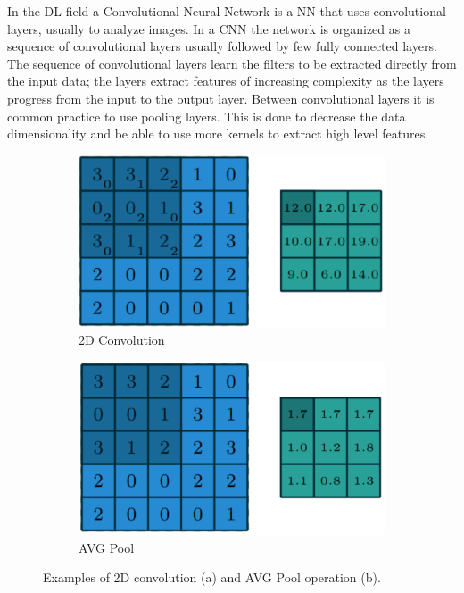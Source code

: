 \documentclass[../main.tex]{subfiles}
\begin{document}
In the DL field a Convolutional Neural Network is a NN that uses convolutional layers, usually to analyze images.
In a CNN the network is organized as a sequence of convolutional layers usually followed by few fully connected layers.
The sequence of convolutional layers learn the filters to be extracted directly from the input data; the layers extract features of increasing complexity as the layers progress from the input to the output layer.
Between convolutional layers it is common practice to use pooling layers. This is done to decrease the data dimensionality and be able to use more kernels to extract high level features.

\begin{figure}[h!]
    \centering
    \begin{subfigure}[]{0.4\linewidth}
        \label{fig:conv}
        \includegraphics[width=\linewidth]{images/Convolution.png}
        \caption{2D Convolution}
    \end{subfigure}
    \hspace{1cm}
    \begin{subfigure}[]{0.4\linewidth}
        \label{fig:avgPool}
        \includegraphics[width=\linewidth]{images/AVGPool.png}
        \caption{AVG Pool}
    \end{subfigure}
    \caption{Examples of 2D convolution (a) and AVG Pool operation (b). ~\cite{dumoulin2016guide}}
    \label{fig:ConvImgs}
\end{figure}
\end{document}
